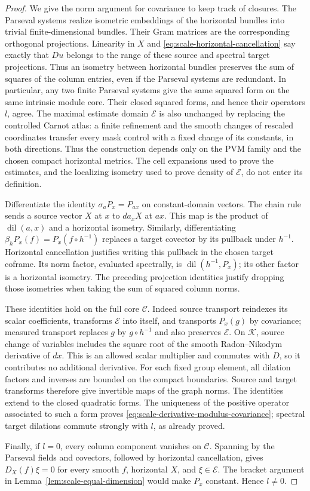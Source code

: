 \begin{proof}
We give the norm argument for covariance to keep track of closures.
The Parseval systems realize isometric embeddings of the horizontal
bundles into trivial finite-dimensional bundles.  Their Gram matrices
are the corresponding orthogonal projections.  Linearity in $X$ and
\eqref{eq:scale-horizontal-cancellation} say exactly that $Du$ belongs
to the range of these source and spectral target projections.  Thus
an isometry between horizontal bundles preserves the sum of squares
of the column entries, even if the Parseval systems are redundant.
In particular, any two finite Parseval systems give the same squared
form on the same intrinsic module core.  Their closed squared forms,
and hence their operators $l$, agree.  The maximal estimate domain
$\mathscr E$ is also unchanged by replacing the controlled Carnot
atlas: a finite refinement and the smooth changes of rescaled
coordinates transfer every mask control with a fixed change of its
constants, in both directions.  Thus the construction depends only on
the PVM family and the chosen compact horizontal metrics.  The cell
expansions used to prove the estimates, and the localizing isometry
used to prove density of $\mathscr E$, do not enter its definition.

Differentiate the identity $\sigma_aP_x=P_{ax}$ on constant-domain
vectors.  The chain rule sends a source vector $X$ at $x$ to
$da_xX$ at $ax$.  This map is the product of
$\operatorname{dil}(a,x)$ and a horizontal isometry.  Similarly,
differentiating $\beta_hP_x(f)=P_x(f\circ h^{-1})$ replaces a target
covector by its pullback under $h^{-1}$.  Horizontal cancellation
justifies writing this pullback in the chosen target coframe.  Its
norm factor, evaluated spectrally, is
$\operatorname{dil}(h^{-1},P_x)$; its other factor is a horizontal
isometry.  The preceding projection identities justify dropping those
isometries when taking the sum of squared column norms.

These identities hold on the full core $\mathcal C$.  Indeed source
transport reindexes its scalar coefficients, transforms
$\mathscr E$ into itself, and transports $P_x(g)$ by covariance;
measured transport replaces $g$ by $g\circ h^{-1}$ and also preserves
$\mathscr E$.  On $\mathcal K$, source change of variables includes
the square root of the smooth Radon--Nikodym derivative of $dx$.
This is an allowed scalar multiplier and commutes with $D$, so it
contributes no additional derivative.  For each fixed group element,
all dilation factors and inverses are bounded on the compact
boundaries.  Source and target transforms therefore give invertible
maps of the graph norms.  The identities extend to the closed
quadratic forms.  The uniqueness of the positive operator associated
to such a form proves
\eqref{eq:scale-derivative-modulus-covariance}; spectral target
dilations commute strongly with $l$, as already proved.

Finally, if $l=0$, every column component vanishes on $\mathcal C$.
Spanning by the Parseval fields and covectors, followed by horizontal
cancellation, gives $D_X(f)\xi=0$ for every smooth $f$, horizontal $X$,
and $\xi\in\mathscr E$.  The bracket argument in
Lemma~\ref{lem:scale-equal-dimension} would make $P_x$
constant.  Hence $l\ne0$.
\end{proof}

